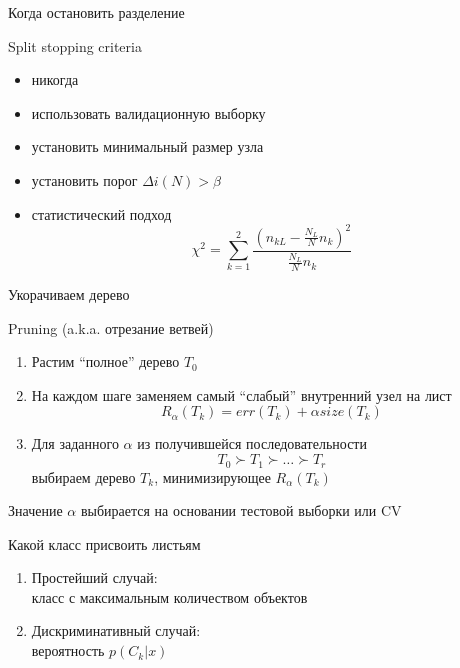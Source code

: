 \documentclass[10pt]{beamer}
\begin{document}
\begin{frame}{Когда остановить разделение}

Split stopping criteria
\begin{itemize}
\item никогда
\item использовать валидационную выборку
\item установить минимальный размер узла
\item установить порог $\Delta i(N) > \beta$
\item статистический подход
\[
\chi^2 = \sum_{k=1}^2 \frac{(n_{kL} - \frac{N_L}{N} n_{k})^2}{\frac{N_L}{N} n_{k}}
\]
\end{itemize}

\end{frame}

\begin{frame}{Укорачиваем дерево}

Pruning (a.k.a. отрезание ветвей)
\begin{enumerate}
\item Растим ``полное'' дерево $T_0$
\item На каждом шаге заменяем самый ``слабый'' внутренний узел на лист
\[
R_{\alpha}(T_k) = err(T_k) + \alpha size(T_k)
\]
\item Для заданного $\alpha $ из получившейся последовательности 
\[
T_0 \succ T_1 \succ \ldots \succ T_r
\]
выбираем дерево $T_k$, минимизирующее $R_{\alpha}(T_k)$
\end{enumerate}
Значение $\alpha$  выбирается на основании тестовой выборки или CV

\end{frame}

\begin{frame}{Какой класс присвоить листьям}

\begin{enumerate}
\item Простейший случай: \\ класс с максимальным количеством объектов
\item Дискриминативный случай: \\ вероятность $p(C_k | x)$
\end{enumerate}

\end{frame}
\end{document}
